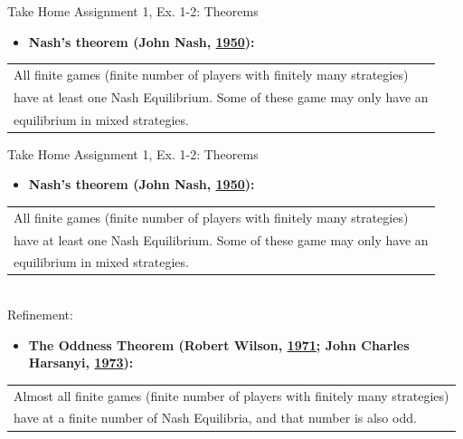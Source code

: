 \begin{frame}{Take Home Assignment 1, Ex. 1-2: Theorems}
  \begin{itemize}
    \item[(1)] \textbf{Nash's theorem (John Nash, \href{https://rbsc.princeton.edu/sites/default/files/Non-Cooperative_Games_Nash.pdf}{1950}):}
  \end{itemize}
    \begin{tabular}{|l|}
      \cline{1-1}
        All finite games (finite number of players with finitely many strategies)\\
        have at least one Nash Equilibrium. Some of these game may only have an\\
        equilibrium in mixed strategies.\\\cline{1-1}
    \end{tabular}
  \vfill\null
\end{frame}
\begin{frame}{Take Home Assignment 1, Ex. 1-2: Theorems}
  \begin{itemize}
    \item[(1)] \textbf{Nash's theorem (John Nash, \href{https://rbsc.princeton.edu/sites/default/files/Non-Cooperative_Games_Nash.pdf}{1950}):}
  \end{itemize}
    \begin{tabular}{|l|}
      \cline{1-1}
        All finite games (finite number of players with finitely many strategies)\\
        have at least one Nash Equilibrium. Some of these game may only have an\\
        equilibrium in mixed strategies.\\\cline{1-1}
    \end{tabular}\\\bigskip
  Refinement:
  \begin{itemize}
    \item[(2)] \textbf{The Oddness Theorem (Robert Wilson, \href{http://www.dklevine.com/archive/refs4402.pdf}{1971}; John Charles Harsanyi, \href{https://link.springer.com/article/10.1007\%2FBF01737572#page-1 }{1973}):}
  \end{itemize}
    \begin{tabular}{|l|}
      \cline{1-1}
        Almost all finite games (finite number of players with finitely many strategies)\\
        have at a finite number of Nash Equilibria, and that number is also odd.\\\cline{1-1}
    \end{tabular}
  \vfill\null
\end{frame}
